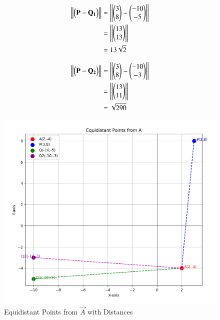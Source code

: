 \documentclass[journal]{IEEEtran}
\begin{document}
\begin{align}
    \left\lVert\begin{pmatrix}\mathbf{P} - \mathbf{Q_1}\end{pmatrix}\right\rVert &= \left\|\begin{pmatrix}3\\8\end{pmatrix} - \begin{pmatrix}-10\\-5\end{pmatrix}\right\| \\
    &= \left\|\begin{pmatrix}13\\13\end{pmatrix}\right\| \\
    &= 13\sqrt{2}
\end{align}

\begin{align}
    \left\lVert\begin{pmatrix}\mathbf{P} - \mathbf{Q_2}\end{pmatrix}\right\rVert &= \left\|\begin{pmatrix}3\\8\end{pmatrix} - \begin{pmatrix}-10\\-3\end{pmatrix}\right\| \\
    &= \left\|\begin{pmatrix}13\\11\end{pmatrix}\right\| \\
    &= \sqrt{290}
\end{align}

\begin{figure}[H]
\centering
\includegraphics[width=0.7\columnwidth]{figs/fig1.png}
 \caption*{Equidistant Points from $\vec{A}$ with Distances}
\label{fig:graph.png}
\end{figure}
\end{document}
